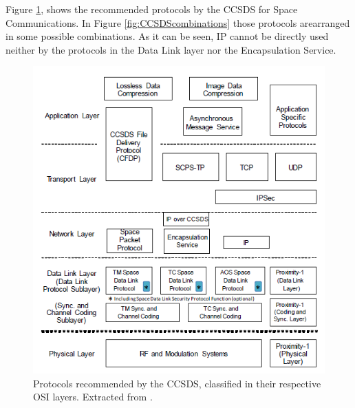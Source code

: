 Figure \ref{fig:CCSDSprotocols}, shows the recommended protocols by the CCSDS for Space Communications. In Figure \ref{fig:CCSDScombinations} those protocols arearranged in some possible combinations. As it can be seen, IP cannot be directly used neither by the protocols in the Data Link layer nor the Encapsulation Service.

\begin{figure}[H]
\begin{center}
\includegraphics[scale=1]{CCSDSprotocols.PNG}
\caption[CCSDS Recommended Protocols]{Protocols recommended by the CCSDS, classified in their respective OSI layers. Extracted from \cite{CCSDSOverview}.}
\label{fig:CCSDSprotocols}
\end{center}
\end{figure}

